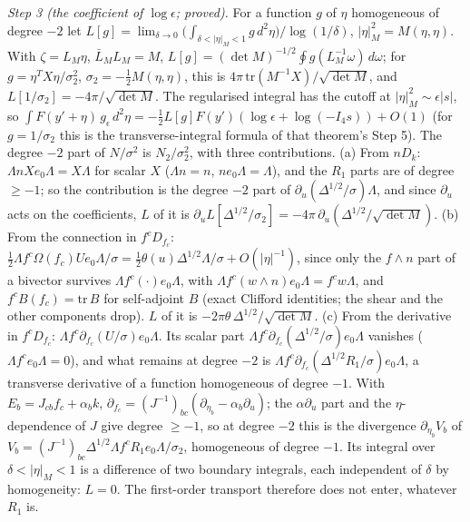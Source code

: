 \emph{Step 3 (the coefficient of $\log\epsilon$; proved).} For a function $g$ of $\eta$ homogeneous of degree $-2$ let $L[g] = \lim_{\delta \to 0}\bigl(\int_{\delta < |\eta|_{M} < 1}g\,d^{2}\eta\bigr)/\log(1/\delta)$, $|\eta|_{M}^{2} = M(\eta, \eta)$. With $\zeta = L_{M}\eta$, $\bar L_{M}L_{M} = M$, $L[g] = (\det M)^{-1/2}\oint g(L_{M}^{-1}\omega)\,d\omega$; for $g = \eta^{T}X\eta/\sigma_{2}^{2}$, $\sigma_{2} = -\tfrac12 M(\eta, \eta)$, this is $4\pi\,\mathrm{tr}(M^{-1}X)/\sqrt{\det M}$, and $L[1/\sigma_{2}] = -4\pi/\sqrt{\det M}$. The regularised integral has the cutoff at $|\eta|_{M}^{2} \sim \epsilon|s|$, so $\int F(y' + \eta)\,g_{\epsilon}\,d^{2}\eta = -\tfrac12 L[g]F(y')(\log\epsilon + \log(-I_{4}s)) + O(1)$ (for $g = 1/\sigma_{2}$ this is the transverse-integral formula of that theorem's Step 5). The degree $-2$ part of $N/\sigma^{2}$ is $N_{2}/\sigma_{2}^{2}$, with three contributions.
(a) From $nD_{k}$: $\Lambda nXe_{0}\Lambda = X\Lambda$ for scalar $X$ ($\Lambda n = n$, $ne_{0}\Lambda = \Lambda$), and the $R_{1}$ parts are of degree $\ge -1$; so the contribution is the degree $-2$ part of $\partial_{u}(\Delta^{1/2}/\sigma)\Lambda$, and since $\partial_{u}$ acts on the coefficients, $L$ of it is $\partial_{u}L[\Delta^{1/2}/\sigma_{2}] = -4\pi\,\partial_{u}(\Delta^{1/2}/\sqrt{\det M})$.
(b) From the connection in $f^{c}D_{f_{c}}$: $\tfrac12\Lambda f^{c}\Omega(f_{c})Ue_{0}\Lambda/\sigma = \tfrac12\theta(u)\Delta^{1/2}\Lambda/\sigma + O(|\eta|^{-1})$, since only the $f\wedge n$ part of a bivector survives $\Lambda f^{c}(\cdot)e_{0}\Lambda$, with $\Lambda f^{c}(w\wedge n)e_{0}\Lambda = f^{c}w\Lambda$, and $f^{c}B(f_{c}) = \mathrm{tr}\,B$ for self-adjoint $B$ (exact Clifford identities; the shear and the other components drop). $L$ of it is $-2\pi\theta\,\Delta^{1/2}/\sqrt{\det M}$.
(c) From the derivative in $f^{c}D_{f_{c}}$: $\Lambda f^{c}\partial_{f_{c}}(U/\sigma)e_{0}\Lambda$. Its scalar part $\Lambda f^{c}\partial_{f_{c}}(\Delta^{1/2}/\sigma)e_{0}\Lambda$ vanishes ($\Lambda f^{c}e_{0}\Lambda = 0$), and what remains at degree $-2$ is $\Lambda f^{c}\partial_{f_{c}}(\Delta^{1/2}R_{1}/\sigma)e_{0}\Lambda$, a transverse derivative of a function homogeneous of degree $-1$. With $E_{b} = J_{cb}f_{c} + \alpha_{b}k$, $\partial_{f_{c}} = (J^{-1})_{bc}(\partial_{\eta_{b}} - \alpha_{b}\partial_{u})$; the $\alpha\partial_{u}$ part and the $\eta$-dependence of $J$ give degree $\ge -1$, so at degree $-2$ this is the divergence $\partial_{\eta_{b}}V_{b}$ of $V_{b} = (J^{-1})_{bc}\Delta^{1/2}\Lambda f^{c}R_{1}e_{0}\Lambda/\sigma_{2}$, homogeneous of degree $-1$. Its integral over $\delta < |\eta|_{M} < 1$ is a difference of two boundary integrals, each independent of $\delta$ by homogeneity: $L = 0$. The first-order transport therefore does not enter, whatever $R_{1}$ is.
